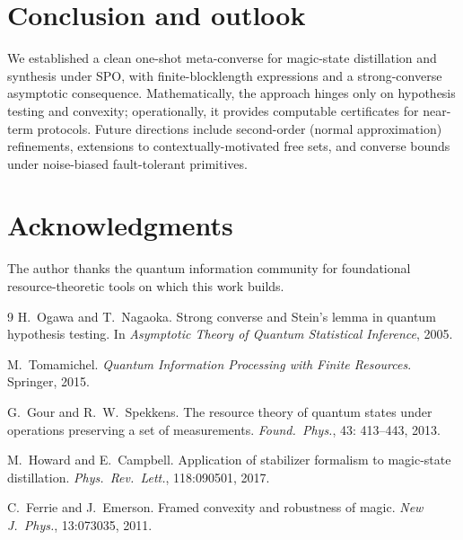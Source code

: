 \documentclass[11pt]{article}
\theoremstyle{definition}
\begin{document}
\section{Conclusion and outlook}
We established a clean one-shot meta-converse for magic-state distillation and synthesis under SPO, with finite-blocklength expressions and a strong-converse asymptotic consequence. Mathematically, the approach hinges only on hypothesis testing and convexity; operationally, it provides computable certificates for near-term protocols. Future directions include second-order (normal approximation) refinements, extensions to contextually-motivated free sets, and converse bounds under noise-biased fault-tolerant primitives.

\section*{Acknowledgments}
The author thanks the quantum information community for foundational resource-theoretic tools on which this work builds.

\begin{thebibliography}{9}
H.~Ogawa and T.~Nagaoka.
\newblock Strong converse and Stein's lemma in quantum hypothesis testing.
\newblock In \emph{Asymptotic Theory of Quantum Statistical Inference}, 2005.

M.~Tomamichel.
\newblock \emph{Quantum Information Processing with Finite Resources}.
\newblock Springer, 2015.

G.~Gour and R.~W.~Spekkens.
\newblock The resource theory of quantum states under operations preserving a set of measurements.
\newblock \emph{Found.\ Phys.}, 43: 413--443, 2013.

M.~Howard and E.~Campbell.
\newblock Application of stabilizer formalism to magic-state distillation.
\newblock \emph{Phys.\ Rev.\ Lett.}, 118:090501, 2017.

C.~Ferrie and J.~Emerson.
\newblock Framed convexity and robustness of magic.
\newblock \emph{New J.\ Phys.}, 13:073035, 2011.
\end{thebibliography}
\end{document}
